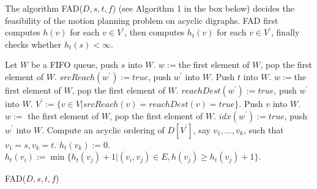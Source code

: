 \documentclass{article}
\begin{document}
\medskip

The algorithm FAD($D,s,t,f$) (see Algorithm 1 in the box below)
decides the feasibility of the motion planning problem on acyclic
digraphs. FAD first computes $h(v)$ for each $v \in V^\prime$, then
computes $h_t(v)$ for each $v \in V^\prime$, finally checks whether
$h_t(s)<\infty$.

\begin{algorithm}[ht]

\dontprintsemicolon \SetVline
{}
Let $W$ be a FIFO queue, push $s$ into $W$.\;
 {}\;
{
$w:=$the first element of $W$, pop the first element of $W$.\;
{
    {$srcReach(w^\prime):=true$, push $w^\prime$ into $W$.}
}
}
Push $t$ into $W$.\;
\;
{
$w:=$the first element of $W$, pop the first element of $W$.\;
{
    {$reachDest(w^\prime):=true$, push $w^\prime$ into $W$.}
}
}
$V^\prime:=\{v \in V | srcReach(v)=reachDest(v)=true\}$.\;
{
\;
\;
Push $v$ into $W$.\;
{
$w:=$ the first element of $W$, pop the first element of $W$.\;
{
{
$idx(w^\prime):=true$, push $w^\prime$ into $W$.\;
}
}
}
}
Compute an acyclic ordering of $D[V^\prime]$, say $v_1,\dots,v_k$,
such that $v_1=s,v_k=t$.\;
$h_t(v_k):=0$.\;
{
{
$h_t(v_i):=\min\{h_t(v_j)+1 |
        (v_i,v_j) \in E, h(v_j) \ge
        h_t(v_j)+1 \}$.\;
}
}
\;
\caption{FAD($D,s,t,f$)\label{Alg:feas-acyclic}}
\end{algorithm}
\end{document}
